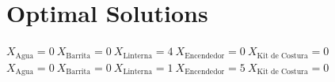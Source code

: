 \documentclass{article}
\begin{document}
\section{Optimal Solutions}
$X_{\text{Agua}}=0 \:X_{\text{Barrita}}=0 \:X_{\text{Linterna}}=4 \:X_{\text{Encendedor}}=0 \:X_{\text{Kit de Costura}}=0 \:$ \newline
$X_{\text{Agua}}=0 \:X_{\text{Barrita}}=0 \:X_{\text{Linterna}}=1 \:X_{\text{Encendedor}}=5 \:X_{\text{Kit de Costura}}=0 \:$ \newline
\end{document}

